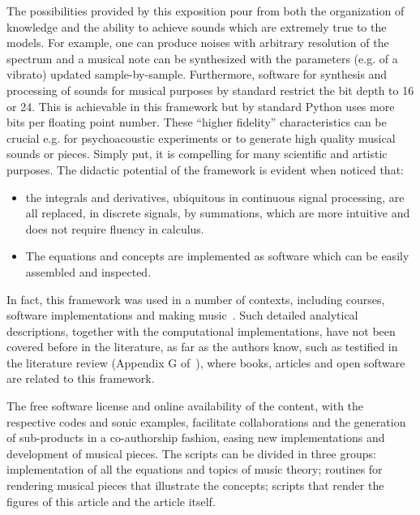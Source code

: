 The possibilities provided by this exposition pour from both the organization of knowledge and the ability to achieve sounds which are extremely true to the models.
For example, one can produce noises with arbitrary resolution of the spectrum and a musical note can be synthesized with the parameters (e.g. of a vibrato) updated sample-by-sample.
Furthermore, software for synthesis and processing of sounds for musical purposes
by standard restrict the bit depth to 16 or 24.
This is achievable in this framework but by standard Python uses more bits per floating point number.
These ``higher fidelity'' characteristics can be crucial
e.g. for psychoacoustic experiments or to generate high quality musical sounds or pieces.
Simply put, it is compelling
for many scientific and artistic purposes.
The didactic potential of the framework is evident when noticed that:
\begin{itemize}
	\item the integrals and derivatives, ubiquitous in continuous signal processing,
are all replaced, in discrete signals, by summations,
which are more intuitive and does not require fluency in calculus.
	\item The equations and concepts are implemented as software which can be easily assembled and inspected.
\end{itemize}
\noindent In fact, this framework was used in a number of contexts, including courses, software implementations and making music~\cite{vimeoLM,vivace,repoDissertacao,dissertacao}.
Such detailed analytical descriptions, together with the computational implementations, have not been covered before in the literature, as far as the authors know, such as testified in the literature review (Appendix G of~\cite{dissertacao}), where books, articles and open software are related to this framework.

The free software license and online availability of the content,
with the respective codes and sonic examples, facilitate collaborations and the generation of sub-products in a co-authorship fashion,
easing new implementations and development of musical pieces.
The scripts can be divided in three groups: implementation of all the equations and topics of music theory; routines for rendering musical pieces that illustrate the concepts; scripts that render the figures of this article and the article itself.

